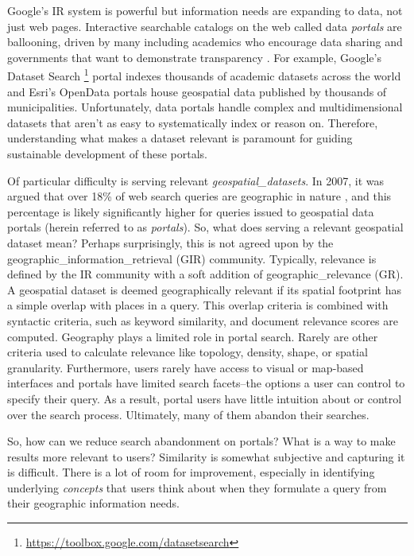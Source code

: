 Google's IR system is powerful but information needs are expanding to data, not just web pages. Interactive searchable catalogs on the web called data \emph{portals} are ballooning, driven by many including academics who encourage data sharing \cite{Lafia2016} and governments that want to demonstrate transparency \cite{Pereira2017}. For example, Google's Dataset Search \footnote{\url{https://toolbox.google.com/datasetsearch}} portal indexes thousands of academic datasets across the world and Esri's OpenData portals house geospatial data published by thousands of municipalities. Unfortunately, data portals handle complex and multidimensional datasets that aren't as easy to systematically index or reason on. Therefore, understanding what makes a dataset relevant is paramount for guiding sustainable development of these portals.

Of particular difficulty is serving relevant \emph{\gls{geospatial_datasets}}. In 2007, it was argued that over 18\% of web search queries are geographic in nature \cite{Sanderson2007}, and this percentage is likely significantly higher for queries issued to geospatial data portals (herein referred to as \emph{\gls{portals}}). So, what does serving a relevant geospatial dataset mean? Perhaps surprisingly, this is not agreed upon by the \gls{geographic_information_retrieval} (\acrshort{GIR}) community. Typically, relevance is defined by the IR community with a soft addition of \gls{geographic_relevance} (\acrshort{GR}). A geospatial dataset is deemed geographically relevant if its spatial footprint has a simple overlap with places in a query. This overlap criteria is combined with syntactic criteria, such as keyword similarity, and document relevance scores are computed. Geography plays a limited role in portal search. Rarely are other criteria used to calculate relevance like topology, density, shape, or spatial granularity. Furthermore, users rarely have access to visual or map-based interfaces and portals have limited search facets–the options a user can control to specify their query. As a result, portal users have little intuition about or control over the search process. Ultimately, many of them abandon their searches.

So, how can we reduce search abandonment on portals? What is a way to make results more relevant to users? Similarity is somewhat subjective and capturing it is difficult. There is a lot of room for improvement, especially in identifying underlying \emph{concepts} that users think about when they formulate a query from their geographic information needs.

